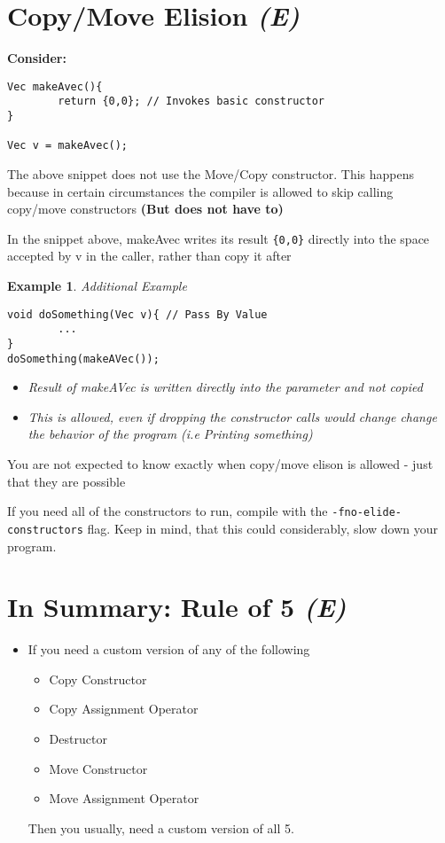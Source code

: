 \documentclass{article}
\newtheorem{ex}[theorem]{Example}
\newenvironment{ablock}[1]{%
    \tcolorbox[beamer,%
    noparskip,breakable,
    colback=lightcoral,colframe=darkred,%
    colbacklower=tomato!75!lightcoral,%
    title=#1]}%
    {\endtcolorbox}
\begin{document}
\newpage
\section{Copy/Move Elision \textit{(E)}}

\textbf{Consider:}
\begin{lstlisting}
Vec makeAvec(){
		return {0,0}; // Invokes basic constructor
}

Vec v = makeAvec();
\end{lstlisting} 

The above snippet does not use the Move/Copy constructor. This happens because in certain circumstances the compiler is allowed to skip calling copy/move constructors \textbf{(But does not have to)}

In the snippet above, makeAvec writes its result \verb|{0,0}| directly into the space accepted by v  in the caller, rather than copy it after 

\begin{ex} Additional Example 
\begin{lstlisting}
void doSomething(Vec v){ // Pass By Value
		...
}
doSomething(makeAVec());
\end{lstlisting}
\begin{itemize}
\item Result of makeAVec is written directly into the parameter and not copied
\item This is allowed, even if dropping the constructor calls would change change the behavior of the program (i.e Printing something)
\end{itemize}
\end{ex}

\begin{ablock}{Note :}
You are not expected to know exactly when copy/move elison is allowed - just that they are possible 
\end{ablock}

If you need all of the constructors to run, compile with the \verb|-fno-elide-constructors| flag.  Keep in mind, that this could considerably, slow down your program. 

\section{In Summary: Rule of 5 \textit{(E)}}

\begin{itemize}
\item If you need a custom version of any of the following
\begin{itemize}
\item Copy Constructor 
\item Copy Assignment Operator 
\item Destructor
\item Move Constructor 
\item Move Assignment Operator
\end{itemize}
Then you usually, need a custom version of all 5. 
\end{itemize}
\end{document}
